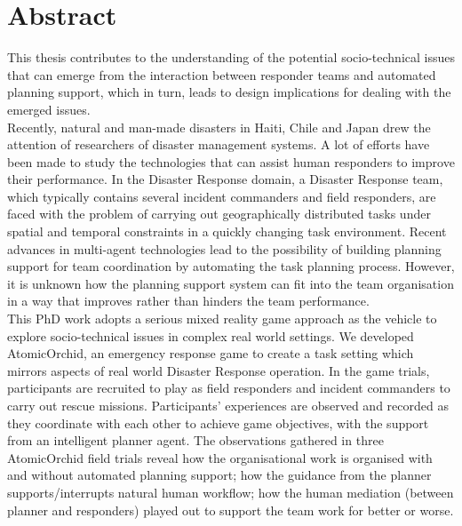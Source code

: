 \begingroup
\let\clearpage\relax
\let\cleardoublepage\relax
\let\cleardoublepage\relax

\chapter*{Abstract}
This thesis contributes to the understanding of the potential socio-technical issues that can emerge from the interaction between responder teams and automated planning support, which in turn, leads to design implications for dealing with the emerged issues. \\

Recently, natural and man-made disasters in Haiti, Chile and Japan drew the attention of researchers of disaster management systems. A lot of efforts have been made to study the technologies that can assist human responders to improve their performance. In the Disaster Response domain,  a Disaster Response team, which typically contains several incident commanders and field responders, are faced with the problem of carrying out geographically distributed tasks under spatial and temporal constraints in a quickly changing task environment. Recent advances in multi-agent technologies lead to the possibility of building planning support for team coordination by automating the task planning process. However, it is unknown how the planning support system can fit into the team organisation in a way that improves rather than hinders the team performance.\\

This PhD work adopts a serious mixed reality game approach as the vehicle to explore socio-technical issues in complex real world settings. We developed AtomicOrchid, an emergency response game to create a task setting which mirrors aspects of real world Disaster Response operation. In the game trials, participants are recruited to play as field responders and incident commanders to carry out rescue missions. Participants' experiences are observed and recorded as they coordinate with each other to achieve game objectives, with the support from an intelligent planner agent. The observations gathered in three AtomicOrchid field trials reveal how the organisational work is organised with and without automated planning support; how the guidance from the planner supports/interrupts natural human workflow; how the human mediation (between planner and responders) played out to support the team work for better or worse. \\

